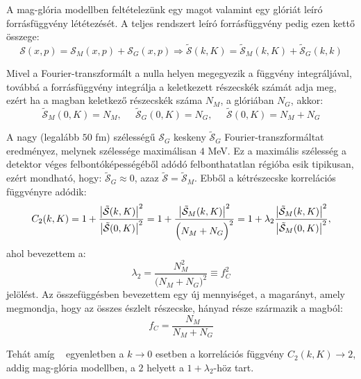 \documentclass[11pt,a4paper]{article}
\numberwithin{equation}{subsection}
\numberwithin{figure}{section}
\begin{document}
A mag-glória modellben feltételezünk egy magot valamint egy glóriát leíró forrásfüggvény lététezését. A teljes rendszert leíró forrásfüggvény pedig ezen kettő összege:
\begin{equation}
\mathcal{S}(x,p)=\mathcal{S}_M(x,p)+ \mathcal{S}_G(x,p)\Longrightarrow \mathcal{\tilde{S}}(k, K) = \mathcal{\tilde{S}}_M(k,K)+\mathcal{\tilde{S}}_G(k,k)
\end{equation}

Mivel a Fourier-transzformált a nulla helyen megegyezik a függvény integráljával, továbbá a forrásfüggvény integrálja a keletkezett részecskék számát adja meg, ezért ha a magban keletkező részecskék száma $N_M$, a glóriában $N_G$, akkor:
\begin{equation}
\mathcal{\tilde{S}}_M(0,K) = N_M,\;\;\;\;\; 
\mathcal{\tilde{S}}_G(0,K) = N_G,\;\;\;\;\;
\mathcal{\tilde{S}}(0,K) = N_M+N_G
\end{equation}

A nagy (legalább $50$ fm) szélességű $\mathcal{S}_G$ keskeny $\mathcal{\tilde{S}}_G$ Fourier-transzformáltat eredményez, melynek  szélessége maximálisan $4$ MeV. Ez a maximális szélesség a detektor véges felbontóképességéből adódó felbonthatatlan régióba esik tipikusan, ezért mondható, hogy: $\mathcal{\tilde{S}}_G\approx 0$, azaz $\mathcal{\tilde{S}}=\mathcal{\tilde{S}}_M$. Ebből a kétrészecske korrelációs függvényre adódik:
\begin{equation}
C_2({k}, {K})=1+\frac{\abs{\tilde{\mathcal{S}}({k},{K})}^2}{\abs{\tilde{\mathcal{S}}(0,{K})}^2} =
1+\frac{\abs{\tilde{\mathcal{S}}_M({k},{K})}^2}{\Big(N_M+N_G\Big)^2}
 =
  1+\lambda_2\frac{\abs{\tilde{\mathcal{S}}_M({k},{K})}^2}{\abs{\tilde{\mathcal{S}}_M(0,{K})}^2},
 \label{eq:CHC2}
\end{equation}
ahol bevezettem a:
\begin{equation}
\lambda_2=\frac{N_M^2}{\Big(N_M+N_G\Big)^2} \equiv f_C^2
\label{eq:CHlambda2}
\end{equation}
jelölést. Az összefüggésben bevezettem egy új mennyiséget, a magarányt, amely megmondja, hogy az összes észlelt részecske, hányad része származik a magból:
\begin{equation}
f_C=\frac{N_M}{N_M+N_G}
\label{eq:fC}
\end{equation}

Tehát amíg ~ egyenletben a $k\rightarrow 0$ esetben a korrelációs függvény $C_2(k,K)\rightarrow 2$, addig mag-glória modellben, a $2$ helyett a $1+\lambda_2$-höz tart.
\end{document}
